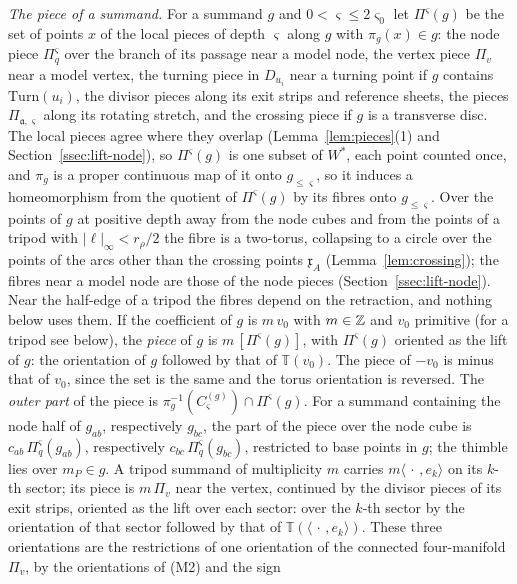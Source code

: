 \emph{The piece of a summand.} For a summand $g$ and $0<\varsigma\le2\varsigma_0$ let $\Pi^\varsigma(g)$ be the set of
points $x$ of the local pieces of depth $\varsigma$ along $g$ with $\pi_g(x)\in g$: the node piece $\Pi^\varsigma_q$ over the
branch of its passage near a model node, the vertex piece $\Pi_v$ near a model vertex, the turning piece in $D_{u_i}$
near a turning point if $g$ contains $\mathrm{Turn}(u_i)$, the divisor pieces along its exit strips and reference sheets,
the pieces $\Pi_{\mathfrak a,\varsigma}$ along its rotating stretch, and the crossing piece if $g$ is a transverse disc. The
local pieces agree where they overlap (Lemma~\ref{lem:pieces}(1) and Section~\ref{ssec:lift-node}), so $\Pi^\varsigma(g)$ is
one subset of $W^*$, each point counted once, and $\pi_g$ is a proper continuous map of it onto $g_{\le\varsigma}$, so it
induces a homeomorphism from the quotient of $\Pi^\varsigma(g)$ by its fibres onto $g_{\le\varsigma}$. Over the points of
$g$ at positive depth away from the node cubes and from the points of a tripod with $|\ell|_\infty<r_\rho/2$ the fibre is a
two-torus, collapsing to a circle over the points of the arcs other than the crossing points $\mathfrak x_A$
(Lemma~\ref{lem:crossing}); the fibres near a model node are those of the node pieces
(Section~\ref{ssec:lift-node}). Near the half-edge of a tripod the fibres depend on the retraction, and nothing below uses
them. If the coefficient of $g$ is $m\,v_0$ with $m\in\mathbb Z$ and $v_0$ primitive (for a tripod see below), the \emph{piece} of $g$ is
$m\,[\Pi^\varsigma(g)]$, with $\Pi^\varsigma(g)$ oriented as the lift of $g$: the orientation of $g$ followed by that of
$\mathbb T(v_0)$. The piece of $-v_0$ is minus that of $v_0$, since the set is the same and the torus orientation is
reversed. The \emph{outer part} of the piece is $\pi_g^{-1}(C^{(g)}_\varsigma)\cap\Pi^\varsigma(g)$. For a summand containing
the node half of $g_{ab}$, respectively $g_{bc}$, the part of the piece over the node cube is $c_{ab}\,\Pi^\varsigma_q(g_{ab})$,
respectively $c_{bc}\,\Pi^\varsigma_q(g_{bc})$, restricted to base points in $g$; the thimble lies over $m_P\in g$. A tripod
summand of multiplicity $m$ carries $m\langle\,\cdot\,,e_k\rangle$ on its $k$-th sector; its piece is $m\,\Pi_v$ near the
vertex, continued by the divisor pieces of its exit strips, oriented as the lift over each sector: over the $k$-th sector
by the orientation of that sector followed by that of $\mathbb T(\langle\,\cdot\,,e_k\rangle)$. These three orientations are
the restrictions of one orientation of the connected four-manifold $\Pi_v$, by the orientations of (M2) and the sign
